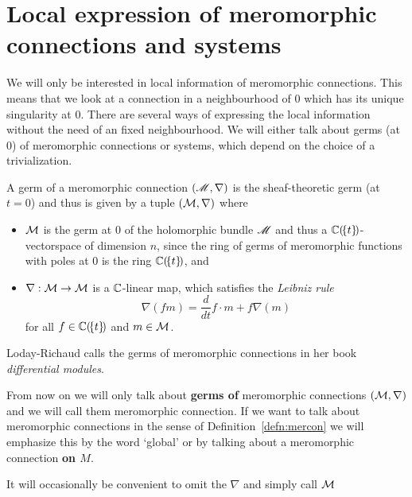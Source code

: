 \section{Local expression of meromorphic connections and systems}
We will only be interested in local information of meromorphic connections.
This means that we look at a connection in a neighbourhood of $0$ which has its
unique singularity at $0$.
There are several ways of expressing the local information without the need of
an fixed neighbourhood.
We will either talk about germs (at $0$) of meromorphic connections or systems,
which depend on the choice of a trivialization.
\begin{prop}
  A germ of a meromorphic connection $(\mathscr{M},\nabla)$ is the sheaf-theoretic
  germ (at $t=0$) and thus is given by a tuple $(\mathcal{M},\nabla)$ where
  \begin{itemize}
    \item $\mathcal{M}$ is the germ at $0$ of the holomorphic bundle $\mathscr{M}$ and thus a
      $\mathbb{C}(\!\{t\}\!)$-vectorspace of dimension $n$, since the ring of germs of
      meromorphic functions with poles at $0$ is the ring $\mathbb{C}(\!\{t\}\!)$, and
    \item $\nabla:\mathcal{M}\to \mathcal{M}$ is a $\mathbb{C}$-linear map, which
      satisfies the \emph{Leibniz rule}
      \[
        \nabla(fm)=\frac{d}{dt} f\cdot m + f\nabla(m)
      \]
      for all $f\in\mathbb{C}(\!\{t\}\!)$ and $m\in \mathcal{M}$.
  \end{itemize}
  \begin{s-rem}
    Loday-Richaud calls the germs of meromorphic connections in her
    book~\cite[Def.4.2.1]{Loday2014} \emph{differential modules}.
  \end{s-rem}
\end{prop}
\begin{rem}\label{rem:GlobalNothingGerm}
  From now on we will only talk about \textbf{germs of} meromorphic
  connections $(\mathcal{M},\nabla)$ and we will call them meromorphic connection. If
  we want to talk about meromorphic connections in the sense of
  Definition~\ref{defn:mercon} we will emphasize this by the word `global' or
  by talking about a meromorphic connection \textbf{on $M$}.
\end{rem}
It will occasionally be convenient to omit the $\nabla$ and simply call $\mathcal{M}$
